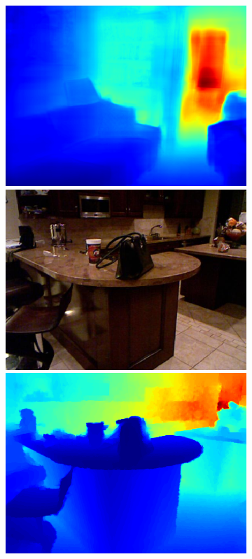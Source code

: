 \begin{figure}[htb]
\begin{subfigure}{0.15\linewidth}
\begin{minipage}[t]{1\linewidth}
  \includegraphics[width=1\linewidth]{figure/nyu_without/bedroom_rgb_00170.png}
  \includegraphics[width=1\linewidth]{figure/nyu_rgb/850.png}
  \includegraphics[width=1\linewidth]{figure/nyu_gt/850.png}

\end{minipage}
\end{subfigure}
\end{figure}
